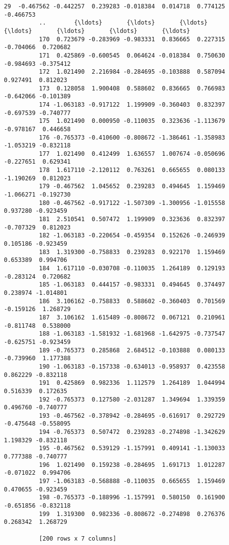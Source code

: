\documentclass[11pt]{article}
\begin{document}
\begin{Verbatim}[commandchars=\\\{\}]
          29  -0.467562 -0.442257  0.239283 -0.018384  0.014718  0.774125 -0.466753
          ..        {\ldots}       {\ldots}       {\ldots}       {\ldots}       {\ldots}       {\ldots}       {\ldots}
          170  0.723679 -0.283969 -0.983331  0.836665  0.227315 -0.704066  0.720682
          171  0.425869 -0.600545  0.064624 -0.018384  0.750630 -0.984693 -0.375412
          172  1.021490  2.216984 -0.284695 -0.103888  0.587094  0.927491  0.812023
          173  0.128058  1.900408  0.588602  0.836665  0.766983 -0.642066 -0.101389
          174 -1.063183 -0.917122  1.199909 -0.360403  0.832397 -0.697539 -0.740777
          175  1.021490  0.000950 -0.110035  0.323636 -1.113679 -0.978167  0.446658
          176 -0.765373 -0.410600 -0.808672 -1.386461 -1.358983 -1.053219 -0.832118
          177  1.021490  0.412499  1.636557  1.007674 -0.050696 -0.227651  0.629341
          178  1.617110 -2.120112  0.763261  0.665655  0.080133 -1.190269  0.812023
          179 -0.467562  1.045652  0.239283  0.494645  1.159469 -1.066271 -0.192730
          180 -0.467562 -0.917122 -1.507309 -1.300956 -1.015558  0.937280 -0.923459
          181  2.510541  0.507472  1.199909  0.323636  0.832397 -0.707329  0.812023
          182 -1.063183 -0.220654 -0.459354  0.152626 -0.246939  0.105186 -0.923459
          183  1.319300 -0.758833  0.239283  0.922170  1.159469  0.653389  0.994706
          184  1.617110 -0.030708 -0.110035  1.264189  0.129193 -0.283124  0.720682
          185 -1.063183  0.444157 -0.983331  0.494645  0.374497  0.238974 -1.014801
          186  3.106162 -0.758833  0.588602 -0.360403  0.701569 -0.159126  1.268729
          187  3.106162  1.615489 -0.808672  0.067121  0.210961 -0.811748  0.538000
          188 -1.063183 -1.581932 -1.681968 -1.642975 -0.737547 -0.625751 -0.923459
          189 -0.765373  0.285868  2.684512 -0.103888  0.080133 -0.739960  1.177388
          190 -1.063183 -0.157338 -0.634013 -0.958937  0.423558  0.862229 -0.832118
          191  0.425869  0.982336  1.112579  1.264189  1.044994  0.516339  0.172635
          192 -0.765373  0.127580 -2.031287  1.349694  1.339359  0.496760 -0.740777
          193 -0.467562 -0.378942 -0.284695 -0.616917  0.292729 -0.475648 -0.558095
          194 -0.765373  0.507472  0.239283 -0.274898 -1.342629  1.198329 -0.832118
          195 -0.467562  0.539129 -1.157991  0.409141 -1.130033  0.777388 -0.740777
          196  1.021490  0.159238 -0.284695  1.691713  1.012287 -0.071022  0.994706
          197 -1.063183 -0.568888 -0.110035  0.665655  1.159469  0.470655 -0.923459
          198 -0.765373 -0.188996 -1.157991  0.580150  0.161900 -0.651856 -0.832118
          199  1.319300  0.982336 -0.808672 -0.274898  0.276376  0.268342  1.268729
          
          [200 rows x 7 columns]
\end{Verbatim}
            
\end{document}
